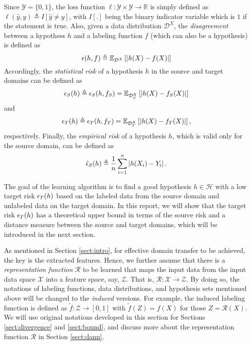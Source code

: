 Since $\mathcal{Y}=\{0, 1\}$, the loss function $\ell: \mathcal{Y} \times \mathcal{Y} \rightarrow \mathbb{R}$ is simply defined as $\ell (\hat{y},y) \triangleq I \left[ \hat{y} \neq y \right]$, with $I[.]$ being the binary indicator variable which is $1$ if the statement is true. Also, given a data distribution $\mathcal{D}^X$, the \textit{disagreement} between a hypothess $h$ and a labeling function $f$ (which can also be a hypothesis) is defined as
\begin{equation}\label{eq:disagreement}
\epsilon(h, f) \triangleq \mathbb{E}_{\mathcal{D}^X}\left[\left \lvert h(X) - f(X) \right \rvert\right]
\end{equation}
Accordingly, the \textit{statistical risk} of a hypothesis $h$ in the source and target domains can be defined as
\begin{equation}\label{eq:RiskS}
\epsilon_{S}(h) \triangleq \epsilon_{S}(h, f_S) = \mathbb{E}_{\mathcal{D}_S^X}\left[\left \lvert h(X) - f_S(X) \right \rvert\right]
\end{equation}
and
\begin{equation}\label{eq:RiskT}
\epsilon_{T}(h) \triangleq \epsilon_{T}(h, f_T) = \mathbb{E}_{\mathcal{D}_T^X}\left[\left \lvert h(X) - f_T(X) \right \rvert\right],
\end{equation}
respectively. Finally, the \textit{empirical risk} of a hypothesis $h$, which is valid only for the source domain, can be defined as
\begin{equation}\label{eq:ERiskS}
\hat{\epsilon}_{S}(h) \triangleq \frac{1}{n} \sum_{i=1}^{n} \left \lvert h(X_i) - Y_i \right \rvert.
\end{equation}

The goal of the learning algorithm is to find a good hypothesis $h \in \mathcal{H}$ with a low target risk $\epsilon_{T}(h)$ based on the labeled data from the source domain and unlabeled data on the target domain. In this report, we will show that the target risk $\epsilon_{T}(h)$ has a theoretical upper bound in terms of the source risk and a distance measure between the source and target domains, which will be introduced in the next section.

As mentioned in Section \ref{sect:intro}, for effective domain transfer to be achieved, the key is the extracted features. Hence, we further assume that there is a \textit{representation function} $\mathcal{R}$ to be learned that maps the input data from the input data space $\mathcal{X}$ into a feature space, say, $\mathcal{Z}$. That is, $\mathcal{R}: \mathcal{X} \rightarrow \mathcal{Z}$. By doing so, the notations of labeling functions, data distributions, and hypothesis sets mentioned above will be changed to the \textit{induced} versions. For example, the induced labeling function is defined as $\tilde{f}: \mathcal{Z} \rightarrow [0,1]$ with $\tilde{f}(Z) = f(X)$ for those $Z = \mathcal{R}(X)$. We will use original notations developed in this section for Sections \ref{sect:divergence} and \ref{sect:bound}, and discuss more about the representation function $\mathcal{R}$ in Section \ref{sect:dann}.

